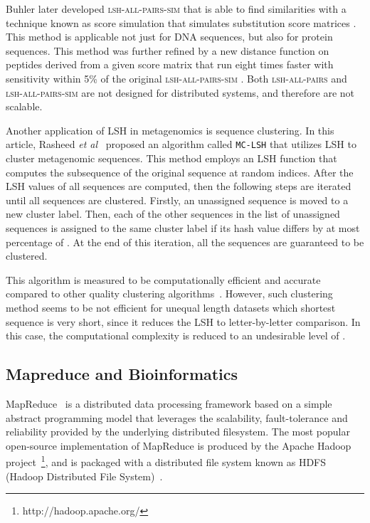 \documentclass[titlepage]{csetr}
\begin{document}
Buhler later developed \textsc{lsh-all-pairs-sim} that is able to find similarities with a technique known as score simulation that simulates substitution score matrices \cite{LSH-ALL-PAIRS-SIM}. This method is applicable not just for DNA sequences, but also for protein sequences. This method was further refined by a new distance function on peptides derived from a given score matrix that run eight times faster with sensitivity within 5\% of the original \textsc{lsh-all-pairs-sim} \cite{LSH-ALL-PAIRS-SIM2}. Both \textsc{lsh-all-pairs} and \textsc{lsh-all-pairs-sim} are not designed for distributed systems, and therefore are not scalable.


Another application of LSH in metagenomics is sequence clustering. In this article, Rasheed \emph{et al}~\cite{EfficientMetagenomicsClusteringLSH} proposed an algorithm called \texttt{MC-LSH} that utilizes LSH to cluster metagenomic sequences. This method employs an LSH function that computes the subsequence of the original sequence at  random indices. After the LSH values of all sequences are computed, then the following steps are iterated until all sequences are clustered. Firstly, an unassigned sequence is moved to a new cluster label. Then, each of the other sequences in the list of unassigned sequences is assigned to the same cluster label if its hash value differs by at most  percentage of . At the end of this iteration, all the sequences are guaranteed to be clustered. 

This algorithm is measured to be computationally efficient and accurate compared to other quality clustering algorithms~\cite{EfficientMetagenomicsClusteringLSH}. However, such clustering method seems to be not efficient for unequal length datasets which shortest sequence is very short, since it reduces the LSH to letter-by-letter comparison. In this case, the computational complexity is reduced to an undesirable level of .

\subsection{Mapreduce and Bioinformatics}


MapReduce~\cite{MapReduce} is a distributed data processing framework based on a simple abstract programming model that leverages the scalability, fault-tolerance and reliability provided by the underlying distributed filesystem. The most popular open-source implementation of MapReduce is produced by the Apache Hadoop project~\footnote{http://hadoop.apache.org/}, and is packaged with a distributed file system known as HDFS (Hadoop Distributed File System)~\cite{HDFS}.
\end{document}
